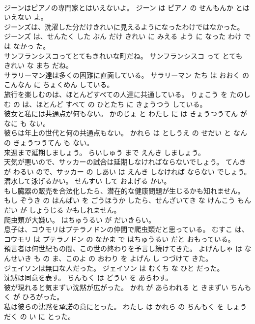 \documentclass[8pt]{extreport}
\begin{document}
\begin{CJK}{UTF8}{min}
\\	ジーンはピアノの専門家とはいえないよ。	ジーン は ピアノ の せんもんか とは いえない よ。	
\\	ジーンズは、洗濯した分だけきれいに見えるようになったわけではなかった。	ジーンズ は、せんたく した ぶん だけ きれい に みえる よう に なった わけ では なかっ た。	
\\	サンフランシスコってとてもきれいな町だね。	サンフランシスコ って とても きれい な まち だね。	
\\	サラリーマン達は多くの困難に直面している。	サラリーマン たち は おおく の こんなん に ちょくめん している。	
\\	旅行を楽しむのは、ほとんどすべての人達に共通している。	りょこう を たのしむ の は、ほとんど すべて の ひとたち に きょうつう している。	
\\	彼女と私には共通点が何もない。	かのじょ と わたし に は きょうつうてん が なに も ない。	
\\	彼らは年上の世代と何の共通点もない。	かれら は としうえ の せだい と なん の きょうつうてん も ない。	
\\	来週まで延期しましょう。	らいしゅう まで えんき しましょう。	
\\	天気が悪いので、サッカーの試合は延期しなければならないでしょう。	てんき が わるい ので、サッカー の しあい は えんき しなければ ならない でしょう。	
\\	潜水して泳げるかい。	せんすい して およげる かい。	
\\	もし臓器の販売を合法化したら、潜在的な健康問題が生じるかも知れません。	もし ぞうき の はんばい を ごうほうか したら、せんざいてき な けんこう もんだい が しょうじる かもしれません。	
\\	爬虫類が大嫌い。	はちゅうるい が だいきらい。	
\\	息子は、コウモリはプテラノドンの仲間で爬虫類だと思っている。	むすこ は、コウモリ は プテラノドン の なかま で はちゅうるい だと おもっている。	
\\	預言者は何世紀もの間、この世の終わりを予言し続けてきた。	よげんしゃ は なんせいき も の ま、このよ の おわり を よげん し つづけて きた。	
\\	ジェイソンは無口な人だった。	ジェイソン は むくち な ひと だった。	
\\	沈黙は同意を表す。	ちんもく は どうい を あらわす。	
\\	彼が現れると気まずい沈黙が広がった。	かれ が あらわれる と きまずい ちんもく が ひろがった。	
\\	私は彼らの沈黙を承諾の意にとった。	わたし は かれら の ちんもく を しょうだく の い に とった。	

\end{CJK}
\end{document}
